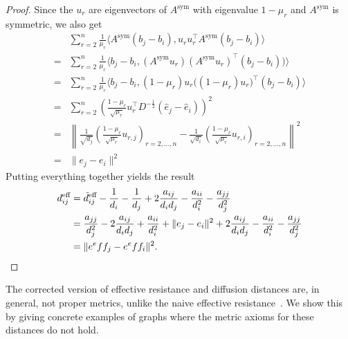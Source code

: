 \documentclass{article}
\newcommand{\asym}{A^{\text{sym}}}
\theoremstyle{plain}
\theoremstyle{definition}
\theoremstyle{remark}
\begin{document}
\begin{proof}
    Since the $u_r$ are eigenvectors of $\asym$ with eigenvalue $1-\mu_r$ and $\asym$ is symmetric, we also get
    \begin{align}
        &\sum_{r=2}^n \frac{1}{\mu_r} \langle \asym (b_j - b_i), u_r u_r^\top \asym (b_j -b_i)\rangle\\
        =& \sum_{r=2}^n \frac{1}{\mu_r} \langle b_j - b_i,  (\asym u_r)( \asym u_r)^\top (b_j -b_i))\rangle\\
        =& \sum_{r=2}^n \frac{1}{\mu_r} \langle b_j - b_i,  (1-\mu_r) u_r\big( (1-\mu_r) u_r\big)^\top (b_j -b_i)\rangle\\
        = & \sum_{r=2}^n  \left(\frac{1-\mu_r}{\sqrt{\mu_r}}u_r^\top D^{-\frac{1}{2}}(\hat{e}_j - \hat{e}_i)\right)^2\\
        =& \left\| 
        \frac{1}{\sqrt{d_j}} \left(\frac{1-\mu_r}{\sqrt{\mu_r}} u_{r,j}\right)_{r=2,\dots, n}  -
        \frac{1}{\sqrt{d_i}} \left(\frac{1-\mu_r}{\sqrt{\mu_r} }u_{r,i}\right)_{r=2,\dots, n}
        \right\|^2 \\
        =& \| e_j - e_i \|^2
    \end{align}
    Putting everything together yields the result
    \begin{align}
        d^\text{eff}_{ij} &= \tilde{d}^\text{eff}_{ij} - \frac{1}{d_i} - \frac{1}{d_j} + 2 \frac{a_{ij}}{d_id_j} - \frac{a_{ii}}{d_i^2} - \frac{a_{jj}}{d_j^2} \\
        &= \frac{a_{jj}}{d_j^2} - 2 \frac{a_{ij}}{d_id_j} + \frac{a_{ii}}{d_i^2} +  \| e_j - e_i \|^2 + 2 \frac{a_{ij}}{d_id_j} - \frac{a_{ii}}{d_i^2} - \frac{a_{jj}}{d_j^2}\\
        &= \| e^\textnormal{eff}_j - e^\textnormal{eff}_i \|^2.
    \end{align}
\end{proof}

The corrected version of effective resistance and diffusion distances are, in general, not proper metrics, unlike the naive effective resistance~\citep[Corollary 2.4.]{gobel1974random}. We show this by giving concrete examples of graphs where the metric axioms for these distances do not hold.
\end{document}
